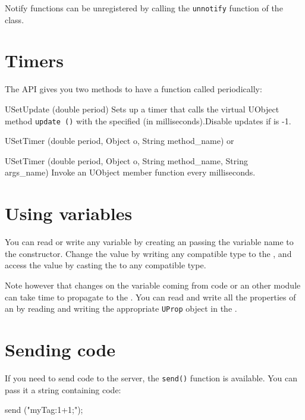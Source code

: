 Notify functions can be unregistered by calling the \lstinline|unnotify|
function of the \UVar class.

\section{Timers}
\label{sec:uob:apijava:timers}

The API gives you two methods to have a function called periodically:

\begin{cxxapi}
\item[USetUpdate (double period)] Sets up a timer that calls the virtual
  UObject method \lstinline{update ()} with the specified  (in
  milliseconds).Disable updates if  is -1.
\item[USetTimer (double period, Object o, String method\_name)] or
\item[USetTimer (double period, Object o, String method\_name, String\[\]
  args\_name)] Invoke an UObject member function  every
   milliseconds.
\end{cxxapi}


\section{Using \urbi variables}
\label{sec:uob:apijava:uvar}

You can read or write any \urbi variable by creating an \UVar passing the
variable name to the constructor. Change the value by writing any compatible
type to the \UVar, and access the value by casting the \UVar to any
compatible type.

Note however that changes on the variable coming from \urbi code or an other
module can take time to propagate to the \UVar.  You can read and write all
the \urbi properties of an \UVar by reading and writing the appropriate
\lstinline{UProp} object in the \UVar.

\section{Sending \urbi code}
\label{sec:uob:apijava:sendcode}

If you need to send \urbi code to the server, the \lstinline{send()} function
is available. You can pass it a string containing \urbi code:

\begin{urbiunchecked}
send ("myTag:1+1;");
\end{urbiunchecked}

